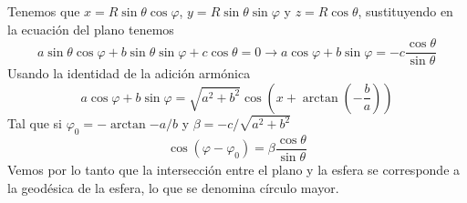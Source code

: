 Tenemos que $x=R\sin{\theta}\cos{\varphi}$, $y=R\sin{\theta}\sin{\varphi}$ y $z=R\cos{\theta}$, sustituyendo en la ecuación del plano tenemos
\[a\sin{\theta}\cos{\varphi}+b\sin{\theta}\sin{\varphi}+c\cos{\theta}=0 \rightarrow a\cos{\varphi}+b\sin{\varphi}=-c\frac{\cos{\theta}}{\sin{\theta}}\]
Usando la identidad de la adición armónica
\[a\cos{\varphi}+b\sin{\varphi}=\sqrt{a^2+b^2}\cos\left({x+\arctan\left({-\frac{b}{a}}\right)}\right)\]
Tal que si $\varphi_0=-\arctan{-a/b}$ y $\beta = -c/\sqrt{a^2+b^2}$
\[\cos({\varphi -\varphi_0})=\beta \frac{\cos\theta}{\sin\theta}\]
Vemos por lo tanto que la intersección entre el plano y la esfera se corresponde a la geodésica de la esfera, lo que se denomina círculo mayor.